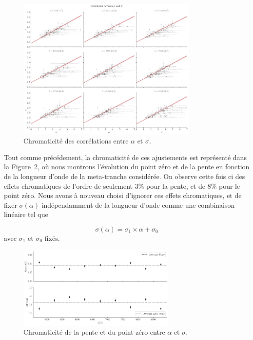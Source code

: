 \documentclass[../main/main.tex]{subfiles}
\begin{document}
\begin{figure}[ht]
  \centering
  \includegraphics[width=0.8\textwidth]{../figures/06_irf/STD_alpha_sigma_chromatic_corr.pdf}
  \caption[Chromaticité des corrélations entre $\alpha$ et $\sigma$]{Chromaticité des corrélations entre $\alpha$ et $\sigma$.}
  \label{fig:alphasigmachromcorr}
\end{figure}

Tout comme précédement, la chromaticité de ces ajustements est représenté dans la
Figure~\ref{fig:chromslope_zp_alphasigma}, où nous montrons l'évolution
du point zéro et de la pente en fonction de la
longueur d'onde de la meta-tranche considérée. On observe cette fois ci des effets
chromatiques de l'ordre de seulement $3\%$ pour la pente, et de $8\%$ pour le
point zéro.
Nous avons à nouveau choisi d'ignorer ces effets chromatiques, et de fixer
$\sigma(\alpha)$ indépendamment de la longueur d'onde comme une
combinaison linéaire tel que

\begin{equation}
  \label{eq:betaalpha}
  \sigma(\alpha) = \sigma_{1}\times \alpha + \sigma_{0}
\end{equation}
avec $\sigma_{1}$ et $\sigma_{0}$ fixés.

\begin{figure}[ht]
  \centering
  \includegraphics[width=0.7\textwidth]{../figures/06_irf/chromaticitysigma_alpha_corr.pdf}
  \caption[Chromaticité de la pente et du point zéro entre $\alpha$ et $\sigma$]{Chromaticité de la pente et du point zéro entre $\alpha$ et $\sigma$.}
  \label{fig:chromslope_zp_alphasigma}
\end{figure}
\end{document}
